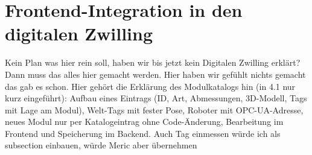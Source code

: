  \section{Frontend-Integration in den digitalen Zwilling}
 \label{sec:digitaler_zwilling}
 Kein Plan was hier rein soll, haben wir bis jetzt kein Digitalen Zwilling erklärt? Dann muss das alles hier gemacht werden. Hier haben wir gefühlt nichts gemacht das gab es schon. Hier gehört die  Erklärung des Modulkatalogs hin (in 4.1 nur kurz eingeführt): Aufbau eines Eintrags (ID, Art, Abmessungen, 3D-Modell, Tags mit Lage am Modul), Welt-Tags mit fester Pose, Roboter mit OPC-UA-Adresse, neues Modul nur per Katalogeintrag ohne Code-Änderung, Bearbeitung im Frontend und Speicherung im Backend. Auch Tag einmessen würde ich als subsection einbauen, würde Meric aber übernehmen
